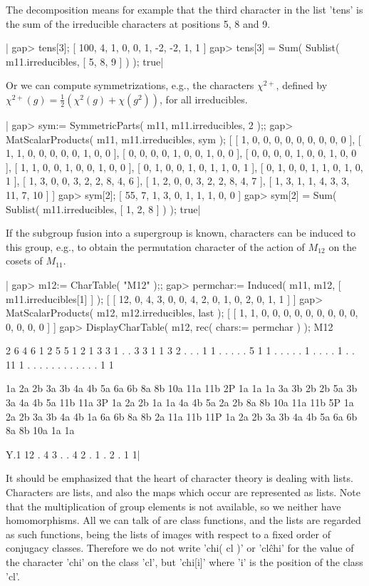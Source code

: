 The decomposition means for example that the third character in the  list
'tens' is the sum of the irreducible characters at positions 5, 8 and 9.

|    gap> tens[3];
    [ 100, 4, 1, 0, 0, 1, -2, -2, 1, 1 ]
    gap> tens[3] = Sum( Sublist( m11.irreducibles, [ 5, 8, 9 ] ) );
    true|

Or  we  can  compute symmetrizations,  e.g.,  the characters $\chi^{2+}$,
defined by  $\chi^{2+}(g)  = \frac{1}{2} ( \chi^2(g) +  \chi(g^2) )$, for
all irreducibles.

|    gap> sym:= SymmetricParts( m11, m11.irreducibles, 2 );;
    gap> MatScalarProducts( m11, m11.irreducibles, sym );
    [ [ 1, 0, 0, 0, 0, 0, 0, 0, 0, 0 ], [ 1, 1, 0, 0, 0, 0, 0, 1, 0, 0 ],
      [ 0, 0, 0, 0, 1, 0, 0, 1, 0, 0 ], [ 0, 0, 0, 0, 1, 0, 0, 1, 0, 0 ],
      [ 1, 1, 0, 0, 1, 0, 0, 1, 0, 0 ], [ 0, 1, 0, 0, 1, 0, 1, 1, 0, 1 ],
      [ 0, 1, 0, 0, 1, 1, 0, 1, 0, 1 ], [ 1, 3, 0, 0, 3, 2, 2, 8, 4, 6 ],
      [ 1, 2, 0, 0, 3, 2, 2, 8, 4, 7 ],
      [ 1, 3, 1, 1, 4, 3, 3, 11, 7, 10 ] ]
    gap> sym[2];
    [ 55, 7, 1, 3, 0, 1, 1, 1, 0, 0 ]
    gap> sym[2] = Sum( Sublist( m11.irreducibles, [ 1, 2, 8 ] ) );
    true|

If  the  subgroup  fusion into a supergroup is  known, characters can  be
induced to this  group, e.g., to obtain the  permutation character of the
action of $M_{12}$ on the cosets of $M_{11}$.

|    gap> m12:= CharTable( "M12" );;
    gap> permchar:= Induced( m11, m12, [ m11.irreducibles[1] ] );
    [ [ 12, 0, 4, 3, 0, 0, 4, 2, 0, 1, 0, 2, 0, 1, 1 ] ]
    gap> MatScalarProducts( m12, m12.irreducibles, last );
    [ [ 1, 1, 0, 0, 0, 0, 0, 0, 0, 0, 0, 0, 0, 0, 0 ] ]
    gap> DisplayCharTable( m12, rec( chars:= permchar ) );
    M12

         2  6  4  6  1  2  5  5  1  2  1  3  3   1   .   .
         3  3  1  1  3  2  .  .  .  1  1  .  .   .   .   .
         5  1  1  .  .  .  .  .  1  .  .  .  .   1   .   .
        11  1  .  .  .  .  .  .  .  .  .  .  .   .   1   1

           1a 2a 2b 3a 3b 4a 4b 5a 6a 6b 8a 8b 10a 11a 11b
        2P 1a 1a 1a 3a 3b 2b 2b 5a 3b 3a 4a 4b  5a 11b 11a
        3P 1a 2a 2b 1a 1a 4a 4b 5a 2a 2b 8a 8b 10a 11a 11b
        5P 1a 2a 2b 3a 3b 4a 4b 1a 6a 6b 8a 8b  2a 11a 11b
       11P 1a 2a 2b 3a 3b 4a 4b 5a 6a 6b 8a 8b 10a  1a  1a

    Y.1    12  .  4  3  .  .  4  2  .  1  .  2   .   1   1|

It should  be  emphasized  that the heart  of character theory is dealing
with lists.  Characters are lists,  and  also  the  maps which  occur are
represented as lists.  Note that the multiplication of group elements  is
not available, so we neither have homomorphisms.  All we can talk  of are
class  functions, and the lists are regarded as such functions, being the
lists  of  images  with  respect to  a fixed order of  conjugacy classes.
Therefore we do not write 'chi( cl )'  or 'cl\^chi' for the value of  the
character 'chi' on the class 'cl', but 'chi[i]' where 'i' is the position
of the class 'cl'.

